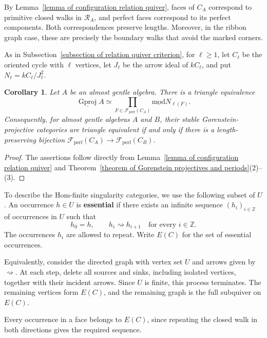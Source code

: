 \documentclass[11pt]{article}
\newcommand{\smod}{\operatorname{\underline{mod}}}
\newtheorem{corollary}[theorem]{Corollary}
\theoremstyle{definition}
\begin{document}
		By Lemma~\ref{lemma of configuration relation quiver}, faces of $C_A$ correspond to primitive closed walks in $\mathcal R_A$, and perfect faces correspond to its perfect components. Both correspondences preserve lengths. Moreover, in the ribbon graph case, these are precisely the boundary walks that avoid the marked corners.

		As in Subsection~\ref{subsection of relation quiver criterion}, for $\ell\geq1$, let $C_\ell$ be the oriented cycle with $\ell$ vertices, let $J_\ell$ be the arrow ideal of $kC_\ell$, and put $N_\ell=kC_\ell/J_\ell^2$.

		\begin{corollary}\label{proposition of configuration Gorenstein criterion}
			Let $A$ be an almost gentle algebra. There is a triangle equivalence
			\[
				\underline{\operatorname{Gproj}}A
				\simeq
				\prod_{F\in\mathcal F_{\mathrm{perf}}(C_A)}\smod N_{\ell(F)}.
			\]
			Consequently, for almost gentle algebras $A$ and $B$, their stable Gorenstein-projective categories are triangle equivalent if and only if there is a length-preserving bijection $\mathcal F_{\mathrm{perf}}(C_A) \rightarrow\mathcal F_{\mathrm{perf}}(C_B)$.
		\end{corollary}

		\begin{proof}
			The assertions follow directly from Lemma~\ref{lemma of configuration relation quiver} and Theorem~\ref{theorem of Gorenstein projectives and periods}(2)--(3).
		\end{proof}

		To describe the Hom-finite singularity categories, we use the following subset of $U$. An occurrence $h\in U$ is \textbf{essential} if there exists an infinite sequence $(h_i)_{i\in\mathbb Z}$ of occurrences in $U$ such that
		\[
			h_0=h,\qquad h_i\rightsquigarrow h_{i+1}
			\quad\text{for every }i\in\mathbb Z.
		\]
		The occurrences $h_i$ are allowed to repeat. Write $E(C)$ for the set of essential occurrences.

		Equivalently, consider the directed graph with vertex set $U$ and arrows given by $\rightsquigarrow$. At each step, delete all sources and sinks, including isolated vertices, together with their incident arrows. Since $U$ is finite, this process terminates. The remaining vertices form $E(C)$, and the remaining graph is the full subquiver on $E(C)$.

		Every occurrence in a face belongs to $E(C)$, since repeating the closed walk in both directions gives the required sequence.
\end{document}
